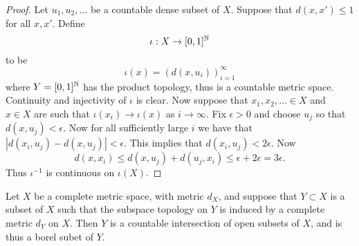 \documentclass[twoside, a4paper, 10pt]{amsart}
\begin{document}
\begin{proof} Let $u_1,u_2,\ldots $ be a countable dense subset of $X$. Suppose that $d(x,x')\leq 1$ for all $x,x'$. Define $$\iota:X \to [0,1]^{\mathbb{N}}$$ to be $$\iota(x) = (d(x,u_i))_{i=1}^{\infty}$$ where $Y=[0,1]^{\mathbb{N}}$ has the product topology, thus is a countable metric space. Continuity and injectivity of $\iota$ is clear. Now suppose that $x_1,x_2,\ldots \in X$ and $x\in X$ are such that $\iota(x_i) \to \iota(x)$ as $i \to \infty$. Fix $\epsilon>0$ and choose $u_j$ so that $d(x,u_j)<\epsilon$. Now for all sufficiently large $i$ we have that $|d(x_i, u_j) - d(x,u_j)| < \epsilon$. This implies that $d(x_i,u_j) < 2\epsilon$. Now $$d(x,x_i) \leq d(x,u_j) + d(u_j,x_i) \leq \epsilon + 2\epsilon  = 3\epsilon.$$ Thus $\iota^{-1}$ is continuous on $\iota(X)$. \end{proof}

\begin{lemma} Let $X$ be a complete metric space, with metric $d_X$, and suppose that $Y \subset X$ is a subset of $X$ such that the subspace topology on $Y$ is induced by a complete metric $d_Y$ on $X$. Then $Y$ is a countable intersection of open subsets of $X$, and is thus a borel subet of $Y$.

\end{lemma}
\end{document}
